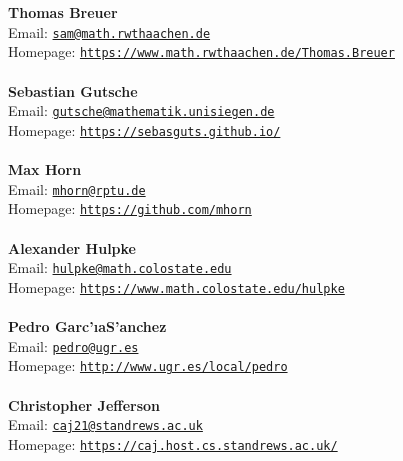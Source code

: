 \documentclass[a4paper,11pt]{report}
\begin{document}
\begin{titlepage}
\mbox{}\\
{\mbox{}\\
\small \noindent \textbf{ Thomas Breuer\\
   }  Email: \href{mailto://sam@math.rwth-aachen.de} {\texttt{sam@math.rwth\texttt{}aachen.de}}\\
  Homepage: \href{https://www.math.rwth-aachen.de/~Thomas.Breuer} {\texttt{https://www.math.rwth\texttt{}aachen.de/\texttt{}Thomas.Breuer}}}\\
{\mbox{}\\
\small \noindent \textbf{ Sebastian Gutsche\\
   }  Email: \href{mailto://gutsche@mathematik.uni-siegen.de} {\texttt{gutsche@mathematik.uni\texttt{}siegen.de}}\\
  Homepage: \href{https://sebasguts.github.io/} {\texttt{https://sebasguts.github.io/}}}\\
{\mbox{}\\
\small \noindent \textbf{ Max Horn\\
   }  Email: \href{mailto://mhorn@rptu.de} {\texttt{mhorn@rptu.de}}\\
  Homepage: \href{https://github.com/mhorn} {\texttt{https://github.com/mhorn}}}\\
{\mbox{}\\
\small \noindent \textbf{ Alexander Hulpke\\
   }  Email: \href{mailto://hulpke@math.colostate.edu} {\texttt{hulpke@math.colostate.edu}}\\
  Homepage: \href{https://www.math.colostate.edu/~hulpke} {\texttt{https://www.math.colostate.edu/\texttt{}hulpke}}}\\
{\mbox{}\\
\small \noindent \textbf{ Pedro Garc{\a'\i}a\texttt{}S{\a'a}nchez\\
   }  Email: \href{mailto://pedro@ugr.es} {\texttt{pedro@ugr.es}}\\
  Homepage: \href{http://www.ugr.es/local/pedro} {\texttt{http://www.ugr.es/local/pedro}}}\\
{\mbox{}\\
\small \noindent \textbf{ Christopher Jefferson\\
   }  Email: \href{mailto://caj21@st-andrews.ac.uk} {\texttt{caj21@st\texttt{}andrews.ac.uk}}\\
  Homepage: \href{https://caj.host.cs.st-andrews.ac.uk/} {\texttt{https://caj.host.cs.st\texttt{}andrews.ac.uk/}}}\\

\end{titlepage}
\end{document}
